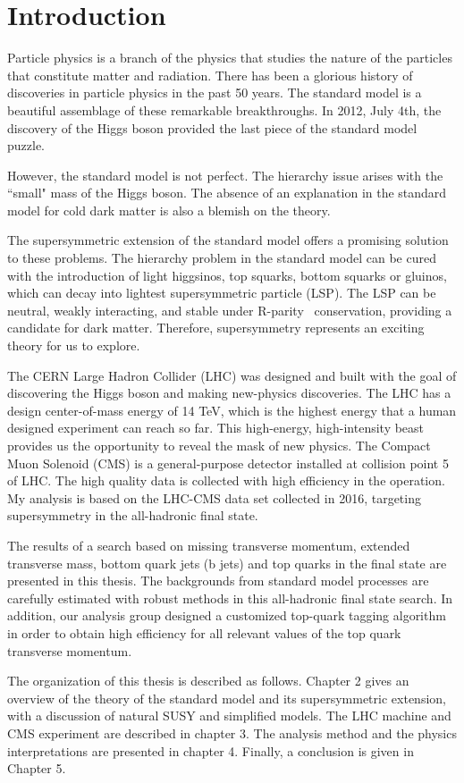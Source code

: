 \chapter{Introduction}
Particle physics is a branch of the physics that studies the nature of the particles that constitute matter and radiation. There has been a glorious history of discoveries in particle physics in the past 50 years. The standard model is a beautiful assemblage of these remarkable breakthroughs. In 2012, July 4th, the discovery of the Higgs boson provided the last piece of the standard model puzzle.

However, the standard model is not perfect. The hierarchy issue arises with the ``small" mass of the Higgs boson. The absence of an explanation in the standard model for cold dark matter is also a blemish on the theory.

The supersymmetric extension of the standard model offers a promising solution to these problems. The hierarchy problem in the standard model can be cured with the introduction of light higgsinos, top squarks, bottom squarks or gluinos, which can decay into lightest supersymmetric particle (LSP). The LSP can be neutral, weakly interacting, and stable under R-parity~\cite{Farrar:1978xj} conservation, providing a candidate for dark matter. Therefore, supersymmetry represents an exciting theory for us to explore.

The CERN Large Hadron Collider (LHC) was designed and built with the goal of discovering the Higgs boson and making new-physics discoveries. The LHC has a design center-of-mass energy of 14 TeV, which is the highest energy that a human designed experiment can reach so far. This high-energy, high-intensity beast provides us the opportunity to reveal the mask of new physics. The Compact Muon Solenoid (CMS) is a general-purpose detector installed at collision point 5 of LHC. The high quality data is collected with high efficiency in the operation. My analysis is based on the LHC-CMS data set collected in 2016, targeting supersymmetry in the all-hadronic final state.

The results of a search based on missing transverse momentum, extended transverse mass, bottom quark jets (b jets) and top quarks in the final state are presented in this thesis. The backgrounds from standard model processes are carefully estimated with robust methods in this all-hadronic final state search. In addition, our analysis group designed a customized top-quark tagging algorithm in order to obtain high efficiency for all relevant values of the top quark transverse momentum.

The organization of this thesis is described as follows. Chapter 2 gives an overview of the theory of the standard model and its supersymmetric extension, with a discussion of natural SUSY and simplified models. The LHC machine and CMS experiment are described in chapter 3. The analysis method and the physics interpretations are presented in chapter 4. Finally, a conclusion is given in Chapter 5.
